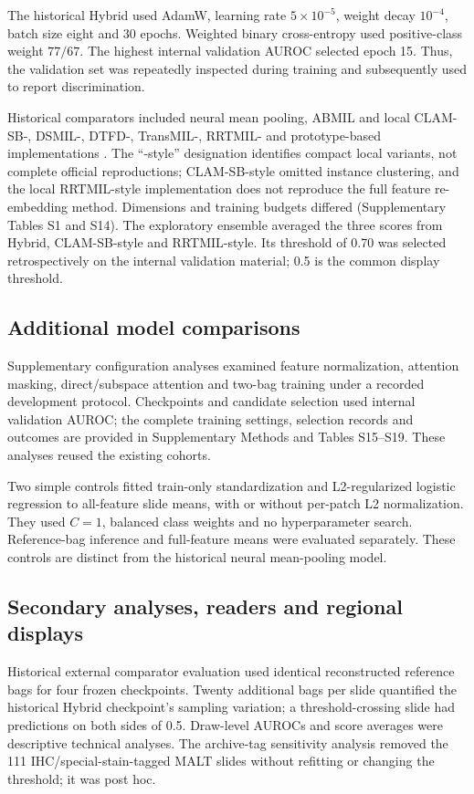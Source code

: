The historical Hybrid used AdamW, learning rate $5\times10^{-5}$, weight decay $10^{-4}$, batch size eight and 30 epochs. Weighted binary cross-entropy used positive-class weight $77/67$. The highest internal validation AUROC selected epoch 15. Thus, the validation set was repeatedly inspected during training and subsequently used to report discrimination.

Historical comparators included neural mean pooling, ABMIL and local CLAM-SB-, DSMIL-, DTFD-, TransMIL-, RRTMIL- and prototype-based implementations \citep{ref5,ref7,ref14,ref15,ref16,ref28}. The ``-style'' designation identifies compact local variants, not complete official reproductions; CLAM-SB-style omitted instance clustering, and the local RRTMIL-style implementation does not reproduce the full feature re-embedding method. Dimensions and training budgets differed (Supplementary Tables S1 and S14). The exploratory ensemble averaged the three scores from Hybrid, CLAM-SB-style and RRTMIL-style. Its threshold of 0.70 was selected retrospectively on the internal validation material; 0.5 is the common display threshold.

\subsection{Additional model comparisons}

Supplementary configuration analyses examined feature normalization, attention masking, direct/subspace attention and two-bag training under a recorded development protocol. Checkpoints and candidate selection used internal validation AUROC; the complete training settings, selection records and outcomes are provided in Supplementary Methods and Tables S15--S19. These analyses reused the existing cohorts.

Two simple controls fitted train-only standardization and L2-regularized logistic regression to all-feature slide means, with or without per-patch L2 normalization. They used $C=1$, balanced class weights and no hyperparameter search. Reference-bag inference and full-feature means were evaluated separately. These controls are distinct from the historical neural mean-pooling model.

\subsection{Secondary analyses, readers and regional displays}

Historical external comparator evaluation used identical reconstructed reference bags for four frozen checkpoints. Twenty additional bags per slide quantified the historical Hybrid checkpoint's sampling variation; a threshold-crossing slide had predictions on both sides of 0.5. Draw-level AUROCs and score averages were descriptive technical analyses. The archive-tag sensitivity analysis removed the 111 IHC/special-stain-tagged MALT slides without refitting or changing the threshold; it was post hoc.

